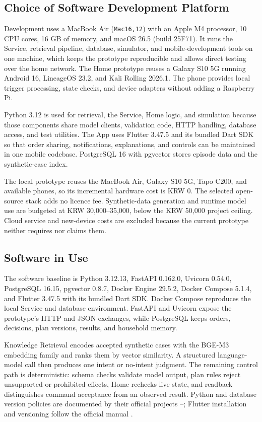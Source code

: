 \documentclass[conference]{IEEEtran}
\begin{document}
\subsection{Choice of Software Development Platform}
Development uses a MacBook Air (\texttt{Mac16,12}) with an Apple M4 processor, 10 CPU cores, 16 GB of memory, and macOS 26.5 (build 25F71). It runs the Service, retrieval pipeline, database, simulator, and mobile-development tools on one machine, which keeps the prototype reproducible and allows direct testing over the home network. The Home prototype reuses a Galaxy S10 5G running Android 16, LineageOS 23.2, and Kali Rolling 2026.1. The phone provides local trigger processing, state checks, and device adapters without adding a Raspberry Pi.

Python 3.12 is used for retrieval, the Service, Home logic, and simulation because those components share model clients, validation code, HTTP handling, database access, and test utilities. The App uses Flutter 3.47.5 and its bundled Dart SDK so that order sharing, notifications, explanations, and controls can be maintained in one mobile codebase. PostgreSQL 16 with pgvector stores episode data and the synthetic-case index.

The local prototype reuses the MacBook Air, Galaxy S10 5G, Tapo C200, and available phones, so its incremental hardware cost is KRW 0. The selected open-source stack adds no licence fee. Synthetic-data generation and runtime model use are budgeted at KRW 30,000--35,000, below the KRW 50,000 project ceiling. Cloud service and new-device costs are excluded because the current prototype neither requires nor claims them.

\subsection{Software in Use}
The software baseline is Python 3.12.13, FastAPI 0.162.0, Uvicorn 0.54.0, PostgreSQL 16.15, pgvector 0.8.7, Docker Engine 29.5.2, Docker Compose 5.1.4, and Flutter 3.47.5 with its bundled Dart SDK. Docker Compose reproduces the local Service and database environment. FastAPI and Uvicorn expose the prototype's HTTP and JSON exchanges, while PostgreSQL keeps orders, decisions, plan versions, results, and household memory.

Knowledge Retrieval encodes accepted synthetic cases with the BGE-M3 embedding family \cite{ref15} and ranks them by vector similarity. A structured language-model call then produces one intent or no-intent judgment. The remaining control path is deterministic: schema checks validate model output, plan rules reject unsupported or prohibited effects, Home rechecks live state, and readback distinguishes command acceptance from an observed result. Python and database version policies are documented by their official projects \cite{ref9}--\cite{ref13}; Flutter installation and versioning follow the official manual \cite{ref14}.
\end{document}
